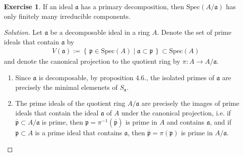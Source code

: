 \documentclass[a4paper]{book}
\theoremstyle{definition}
\newtheorem{exercise}{Exercise}[definition]
\newcommand{\makeset}[2]{\left\{\, #1 \mid #2 \,\right\}}
\begin{document}
\begin{exercise}
    If an ideal \(\mathfrak{a}\) has a primary decomposition, then \(\text{Spec}(A / \mathfrak{a})\) has only finitely many irreducible components.
\end{exercise}
\begin{proof}[Solution]
    Let \(\mathfrak{a}\) be a decomposable ideal in a ring \(A\). Denote the set of prime ideals that contain \(\mathfrak{a}\) by
    \begin{align*}
        V(\mathfrak{a}) := \makeset{\mathfrak{p} \in \text{Spec}(A)}{\mathfrak{a} \subset \mathfrak{p}} \subset \text{Spec}(A)
    \end{align*}
    and denote the canonical projection to the quotient ring by \(\pi: A \longrightarrow A / \mathfrak{a}\).
    \begin{enumerate}
        \item Since \(\mathfrak{a}\) is decomposable, by proposition 4.6., the isolated primes of \(\mathfrak{a}\) are precisely the minimal elemenets of \(S_\mathfrak{a}\).
        \item The prime ideals of the quotient ring \(A / \mathfrak{a}\) are precisely the images of prime ideals that contain the ideal \(\mathfrak{a}\) of \(A\) under the canonical projection, i.e. if \(\overline{\mathfrak{p}} \subset A / \mathfrak{a}\) is prime, then \(\mathfrak{p} = \pi^{-1}(\overline{\mathfrak{p}})\) is prime in \(A\) and contains \(\mathfrak{a}\), and if \(\mathfrak{p} \subset A\) is a prime ideal that contains \(\mathfrak{a}\), then \(\overline{\mathfrak{p}} = \pi(\mathfrak{p})\) is prime in \(A / \mathfrak{a}\).
        

\end{enumerate}
\end{proof}
\end{document}
